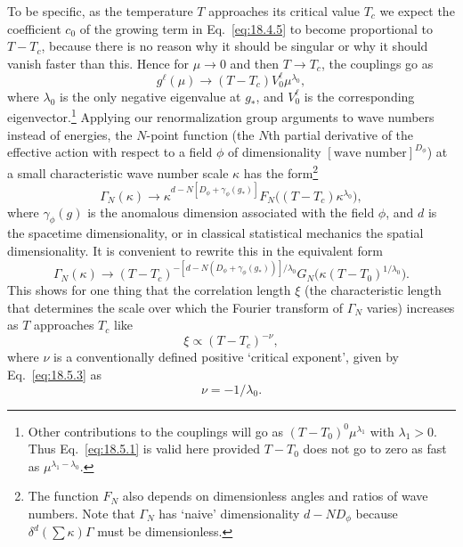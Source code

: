 To be specific, as the temperature $T$ approaches its critical value $T_c$ we expect the coefficient $c_0$ of the growing term in Eq.~\eqref{eq:18.4.5} to become proportional to $T-T_c$, because there is no reason why it should be singular or why it should vanish faster than this. Hence for $\mu\to0$ and then $T\to T_c$, the couplings go as
\begin{equation}
g^\ell(\mu)\to(T-T_c)V_0^\ell\mu^{\lambda_0},
\tag{18.5.1}\label{eq:18.5.1}
\end{equation}
where $\lambda_0$ is the only negative eigenvalue at $g_*$, and $V_0^\ell$ is the corresponding eigenvector.\footnote{Other contributions to the couplings will go as $(T-T_0)^0\mu^{\lambda_1}$ with $\lambda_1>0$. Thus Eq.~\eqref{eq:18.5.1} is valid here provided $T-T_0$ does not go to zero as fast as $\mu^{\lambda_1-\lambda_0}$.} Applying our renormalization group arguments to wave numbers instead of energies, the $N$-point function (the $N$th partial derivative of the effective action with respect to a field $\phi$ of dimensionality $[\text{wave number}]^{D_\phi}$) at a small characteristic wave number scale $\kappa$ has the form\footnote{The function $F_N$ also depends on dimensionless angles and ratios of wave numbers. Note that $\Gamma_N$ has `naive' dimensionality $d-ND_\phi$ because $\delta^d(\sum\kappa)\Gamma$ must be dimensionless.}
\begin{equation}
\Gamma_N(\kappa)\to\kappa^{d-N[D_\phi+\gamma_\phi(g_*)]}
F_N\bigl((T-T_c)\kappa^{\lambda_0}\bigr),
\tag{18.5.2}\label{eq:18.5.2}
\end{equation}
where $\gamma_\phi(g)$ is the anomalous dimension associated with the field $\phi$, and $d$ is the spacetime dimensionality, or in classical statistical mechanics the spatial dimensionality. It is convenient to rewrite this in the equivalent form
\begin{equation}
\Gamma_N(\kappa)\to(T-T_c)^{-[d-N(D_\phi+\gamma_\phi(g_*))]/\lambda_0}
G_N\bigl(\kappa(T-T_0)^{1/\lambda_0}\bigr).
\tag{18.5.3}\label{eq:18.5.3}
\end{equation}
This shows for one thing that the correlation length $\xi$ (the characteristic length that determines the scale over which the Fourier transform of $\Gamma_N$ varies) increases as $T$ approaches $T_c$ like
\begin{equation}
\xi\propto(T-T_c)^{-\nu},
\tag{18.5.4}\label{eq:18.5.4}
\end{equation}
where $\nu$ is a conventionally defined positive `critical exponent', given by Eq.~\eqref{eq:18.5.3} as
\begin{equation}
\nu=-1/\lambda_0.
\tag{18.5.5}\label{eq:18.5.5}
\end{equation}

